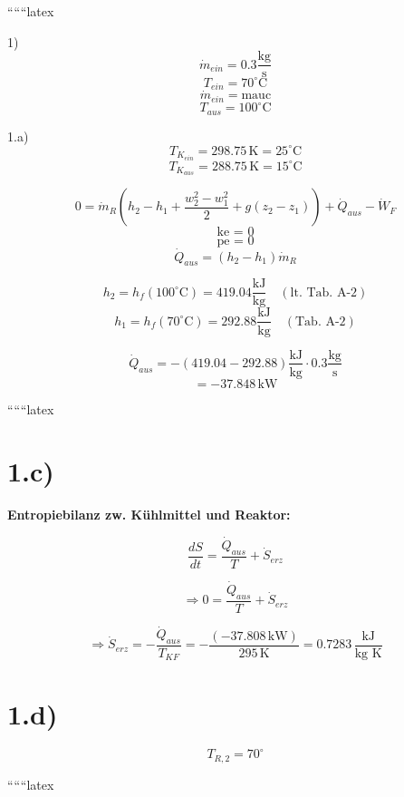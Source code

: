 
``````latex


1) 
\[
\dot{m}_{ein} = 0.3 \frac{\text{kg}}{\text{s}}
\]
\[
T_{ein} = 70^\circ \text{C}
\]
\[
\dot{m}_{ein} = \text{mauc}
\]
\[
T_{aus} = 100^\circ \text{C}
\]

1.a)
\[
T_{K_{ein}} = 298.75 \, \text{K} = 25^\circ \text{C}
\]
\[
T_{K_{aus}} = 288.75 \, \text{K} = 15^\circ \text{C}
\]

\[
0 = \dot{m}_R \left( h_2 - h_1 + \frac{w_2^2 - w_1^2}{2} + g (z_2 - z_1) \right) + \dot{Q}_{aus} - \dot{W}_F
\]
\[
\text{ke = 0}
\]
\[
\text{pe = 0}
\]
\[
\dot{Q}_{aus} = (h_2 - h_1) \dot{m}_R
\]

\[
h_2 = h_f (100^\circ \text{C}) = 419.04 \frac{\text{kJ}}{\text{kg}} \quad (\text{lt. Tab. A-2})
\]
\[
h_1 = h_f (70^\circ \text{C}) = 292.88 \frac{\text{kJ}}{\text{kg}} \quad (\text{Tab. A-2})
\]

\[
\dot{Q}_{aus} = - \left( 419.04 - 292.88 \right) \frac{\text{kJ}}{\text{kg}} \cdot 0.3 \frac{\text{kg}}{\text{s}}
\]
\[
= -37.848 \, \text{kW}
\]

``````latex

\section*{1.c)}
\textbf{Entropiebilanz zw. Kühlmittel und Reaktor:}

\[
\frac{dS}{dt} = \frac{\dot{Q}_{aus}}{T} + \dot{S}_{erz}
\]

\[
\Rightarrow 0 = \frac{\dot{Q}_{aus}}{T} + \dot{S}_{erz}
\]

\[
\Rightarrow \dot{S}_{erz} = -\frac{\dot{Q}_{aus}}{T_{KF}} = -\frac{(-37.808 \, \text{kW})}{295 \, \text{K}} = 0.7283 \, \frac{\text{kJ}}{\text{kg K}}
\]

\section*{1.d)}
\[
T_{R,2} = 70^\circ
\]

``````latex


